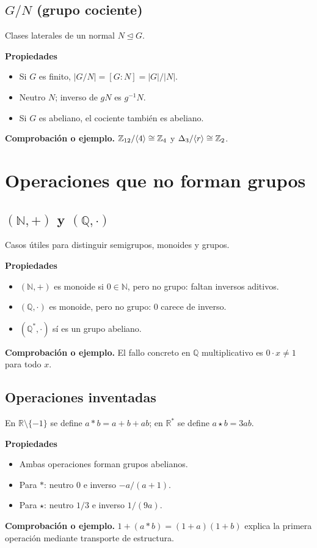 \documentclass[11pt,a4paper]{article}
\newcommand{\N}{\mathbb{N}}\newcommand{\Z}{\mathbb{Z}}\newcommand{\Q}{\mathbb{Q}}\newcommand{\R}{\mathbb{R}}\newcommand{\C}{\mathbb{C}}
\begin{document}
\subsection{$G/N$ (grupo cociente)}
\begin{ejemplo}
Clases laterales de un normal $N\trianglelefteq G$.
\end{ejemplo}
\textbf{Propiedades}
\begin{itemize}
\item Si $G$ es finito, $|G/N|=[G:N]=|G|/|N|$.
\item Neutro $N$; inverso de $gN$ es $g^{-1}N$.
\item Si $G$ es abeliano, el cociente también es abeliano.
\end{itemize}
\textbf{Comprobación o ejemplo.} $\Z_{12}/\gen4\cong\Z_4$ y $\Delta_3/\gen r\cong\Z_2$.

\section{Operaciones que no forman grupos}

\subsection{$(\N,+)$ y $(\Q,\cdot)$}
\begin{ejemplo}
Casos útiles para distinguir semigrupos, monoides y grupos.
\end{ejemplo}
\textbf{Propiedades}
\begin{itemize}
\item $(\N,+)$ es monoide si $0\in\N$, pero no grupo: faltan inversos aditivos.
\item $(\Q,\cdot)$ es monoide, pero no grupo: $0$ carece de inverso.
\item $(\Q^*,\cdot)$ sí es un grupo abeliano.
\end{itemize}
\textbf{Comprobación o ejemplo.} El fallo concreto en $\Q$ multiplicativo es $0\cdot x\ne1$ para todo $x$.

\subsection{Operaciones inventadas}
\begin{ejemplo}
En $\R\setminus\{-1\}$ se define $a*b=a+b+ab$; en $\R^*$ se define $a\star b=3ab$.
\end{ejemplo}
\textbf{Propiedades}
\begin{itemize}
\item Ambas operaciones forman grupos abelianos.
\item Para $*$: neutro $0$ e inverso $-a/(a+1)$.
\item Para $\star$: neutro $1/3$ e inverso $1/(9a)$.
\end{itemize}
\textbf{Comprobación o ejemplo.} $1+(a*b)=(1+a)(1+b)$ explica la primera operación mediante transporte de estructura.
\end{document}
